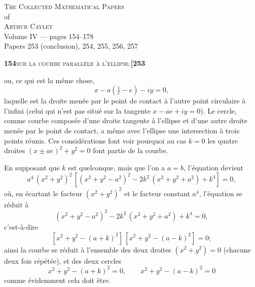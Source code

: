 \documentclass[11pt]{article}
\begin{document}
\thispagestyle{empty}
\begin{center}
\vspace*{2cm}
{\Large\scshape The Collected Mathematical Papers}\\[0.4em]
{\large of}\\[0.4em]
{\Large\scshape Arthur Cayley}\\[1.5em]
{\large Volume IV --- pages 154--178}\\[0.6em]
{\normalsize Papers 253 (conclusion), 254, 255, 256, 257}\\[2em]
\vfill
\end{center}
\newpage

\setcounter{page}{154}


\noindent\textbf{154}\hfill\textsc{sur la courbe parallèle à l'ellipse.}\hfill\textbf{[253}

\medskip

\noindent ou, ce qui est la même chose,
\[
x - a\left(\tfrac{1}{e} - e\right) - iy = 0,
\]
laquelle est la droite menée par le point de contact à l'autre point circulaire à l'infini (celui qui n'est pas situé sur la tangente $x - ae + iy = 0$). Le cercle, comme courbe composée d'une droite tangente à l'ellipse et d'une autre droite menée par le point de contact, a même avec l'ellipse une intersection à trois points réunis. Ces considérations font voir pourquoi au cas $k = 0$ les quatre droites $(x \pm ae)^2 + y^2 = 0$ font partie de la courbe.

En supposant que $k$ est quelconque, mais que l'on a $a = b$, l'équation devient
\[
a^4\,(x^2 + y^2)^2\,[(x^2 + y^2 - a^2)^2 - 2k^2\,(x^2 + y^2 + a^2) + k^4] = 0,
\]
où, en écartant le facteur $(x^2 + y^2)^2$ et le facteur constant $a^4$, l'équation se réduit à
\[
(x^2 + y^2 - a^2)^2 - 2k^2\,(x^2 + y^2 + a^2) + k^4 = 0,
\]
c'est-à-dire
\[
[x^2 + y^2 - (a + k)^2]\,[x^2 + y^2 - (a - k)^2] = 0;
\]
ainsi la courbe se réduit à l'ensemble des deux droites $(x^2 + y^2) = 0$ (chacune deux fois répétée), et des deux cercles
\[
x^2 + y^2 - (a + k)^2 = 0,\qquad x^2 + y^2 - (a - k)^2 = 0
\]
comme évidemment cela doit être.
\end{document}
